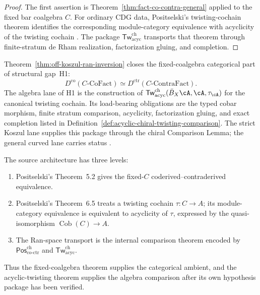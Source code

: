 \begin{proof}
The first assertion is
Theorem~\ref{thm:fact-co-contra-general} applied to the fixed bar
coalgebra \(C\).  For ordinary CDG data, Positselski's
twisting-cochain theorem identifies the corresponding
module-category equivalence with acyclicity of the twisting cochain
\cite[Theorem~6.5]{Positselski11}.  The package
\(\mathsf{Tw}^{\mathrm{ch}}_{\mathrm{acyc}}\) transports that theorem
through finite-stratum de Rham realization, factorization gluing, and
completion.
\end{proof}

\begin{remark}
\label{rem:H1-closure}
Theorem~\ref{thm:off-koszul-ran-inversion} closes the fixed-coalgebra
categorical part of structural gap~H1:
\[
 D^{\mathrm{co}}(C\text{-}\mathrm{CoFact})
 \simeq
 D^{\mathrm{ctr}}(C\text{-}\mathrm{ContraFact}).
\]
The algebra lane of H1 is the construction of
\(\mathsf{Tw}^{\mathrm{ch}}_{\mathrm{acyc}}
(\bar B_X\cA,\cA,\tau_{\cA})\) for the canonical twisting cochain.
Its load-bearing obligations are the typed cobar morphism, finite
stratum comparison, acyclicity, factorization gluing, and exact
completion listed in
Definition~\ref{def:acyclic-chiral-twisting-comparison}.
The strict Koszul lane supplies this package through the chiral
Comparison Lemma; the general curved lane carries status
\ClaimStatusOpen.
\end{remark}

\begin{remark}
\label{rem:off-koszul-evidence}
The source architecture has three levels:
\begin{enumerate}[label=\textup{(\roman*)}]
\item Positselski's Theorem~5.2 gives the fixed-\(C\)
 coderived--contraderived equivalence.
\item Positselski's Theorem~6.5 treats a twisting cochain
 \(\tau\colon C\to A\); its module-category equivalence is equivalent
 to acyclicity of \(\tau\), expressed by the quasi-isomorphism
 \(\operatorname{Cob}(C)\to A\).
\item The Ran-space transport is the internal comparison theorem
 encoded by
 \(\mathsf{Pos}^{\mathrm{ch}}_{\mathrm{co\text{-}ctr}}\) and
 \(\mathsf{Tw}^{\mathrm{ch}}_{\mathrm{acyc}}\).
\end{enumerate}
Thus the fixed-coalgebra theorem supplies the categorical ambient, and
the acyclic-twisting theorem supplies the algebra comparison after its
own hypothesis package has been verified.
\end{remark}
